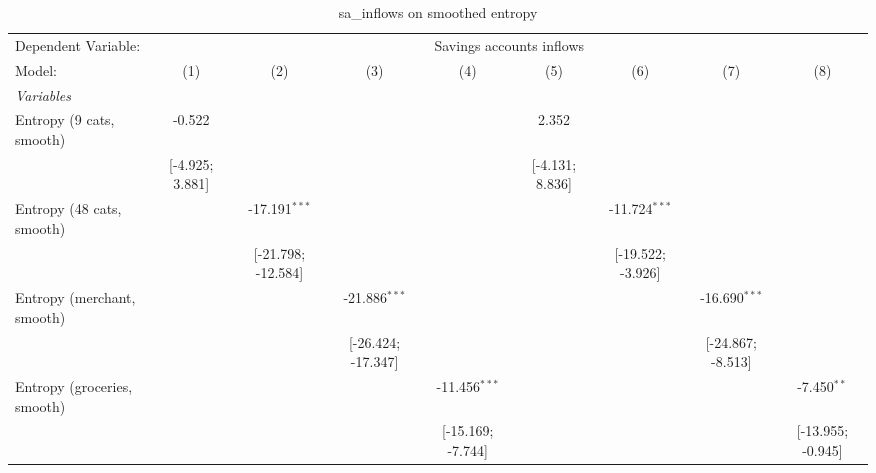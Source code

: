 
\begin{table}[htbp]
   \centering
   \tiny
   \begin{threeparttable}[b]
      \caption{\label{tab:reg_sa_inflows_s} sa\_inflows on smoothed entropy}
      \begin{tabular}{lcccccccc}
         \tabularnewline \midrule \midrule
         Dependent Variable: & \multicolumn{8}{c}{Savings accounts inflows}\\
         Model:                      & (1)               & (2)                & (3)                & (4)               & (5)                 & (6)                 & (7)                 & (8)\\  
         \midrule
         \emph{Variables}\\
         Entropy (9 cats, smooth)    & -0.522            &                    &                    &                   & 2.352               &                     &                     &   \\   
                                     & [-4.925; 3.881]   &                    &                    &                   & [-4.131; 8.836]     &                     &                     &   \\   
         Entropy (48 cats, smooth)   &                   & -17.191$^{***}$    &                    &                   &                     & -11.724$^{***}$     &                     &   \\   
                                     &                   & [-21.798; -12.584] &                    &                   &                     & [-19.522; -3.926]   &                     &   \\   
         Entropy (merchant, smooth)  &                   &                    & -21.886$^{***}$    &                   &                     &                     & -16.690$^{***}$     &   \\   
                                     &                   &                    & [-26.424; -17.347] &                   &                     &                     & [-24.867; -8.513]   &   \\   
         Entropy (groceries, smooth) &                   &                    &                    & -11.456$^{***}$   &                     &                     &                     & -7.450$^{**}$\\   
                                     &                   &                    &                    & [-15.169; -7.744] &                     &                     &                     & [-13.955; -0.945]\\   

\end{tabular}
\end{threeparttable}
\end{table}
